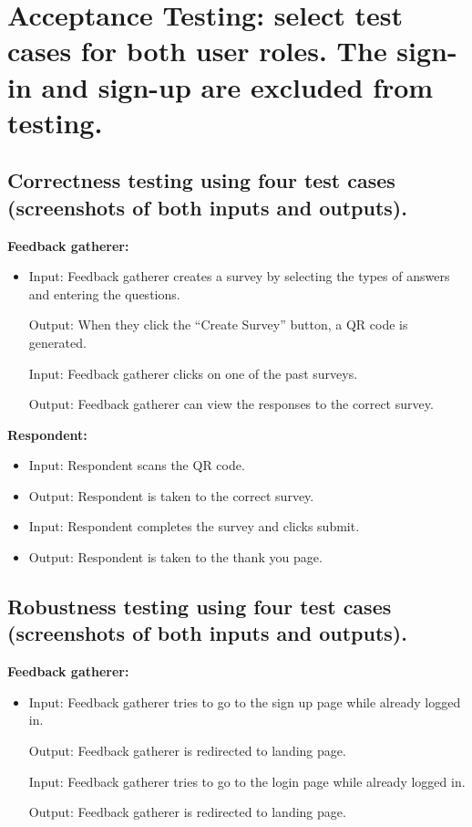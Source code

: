 \documentclass[letterpaper, 12 pt, conference]{ieeeconf}
\begin{document}
\section{Acceptance Testing: select test cases for both user roles. The sign-in and sign-up are excluded from testing.}
\subsection{Correctness testing using four test cases (screenshots of both inputs and outputs).}
\newline

\textbf{Feedback gatherer:}
\begin{itemize}
    \item[] Input: Feedback gatherer creates a survey by selecting the types of answers and entering the questions. 

Output: When they click the “Create Survey” button, a QR code is generated.

Input: Feedback gatherer clicks on one of the past surveys.

Output: Feedback gatherer can view the responses to the correct survey.
\end{itemize}

\hfill \break
\textbf{Respondent:}
\begin{itemize}
    \item[] Input: Respondent scans the QR code.
    \item[] Output: Respondent is taken to the correct survey.
    \item[] Input: Respondent completes the survey and clicks submit.
    \item[] Output: Respondent is taken to the thank you page.
\end{itemize}

\newpage

\subsection{Robustness testing using four test cases (screenshots of both inputs and outputs).}
\newline

\textbf{Feedback gatherer:}

\begin{itemize}
    \item[] Input: Feedback gatherer tries to go to the sign up page while already logged in.

Output: Feedback gatherer is redirected to landing page.

Input: Feedback gatherer tries to go to the login page while already logged in.

Output: Feedback gatherer is redirected to landing page.
\end{itemize}
\newline 
\hfill \break
\end{document}
